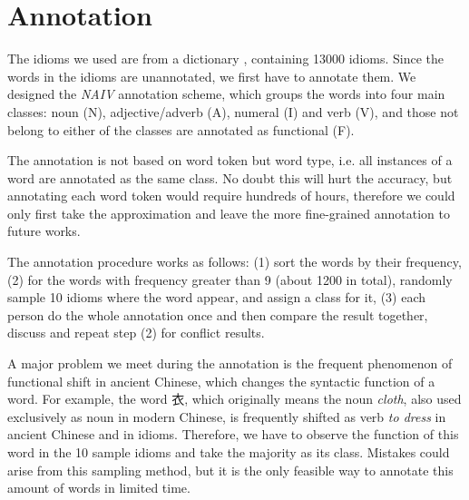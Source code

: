 
\section{Annotation}\label{anno}
The idioms we used are from a dictionary \citep{song:2014}, containing 13000 idioms. 
Since the words in the idioms are unannotated, we first have to annotate them. We designed the {\em NAIV} annotation scheme, which  groups the words into four main classes: noun (N), adjective/adverb (A), numeral (I) and verb (V), and those not belong to either of the classes are annotated as functional (F). 

The annotation is not based on word token but word type, i.e. all instances of a word are annotated as the same class. No doubt this will hurt the accuracy, but annotating each word token would require hundreds of hours, therefore we could only first take the approximation and leave the more fine-grained annotation to future works.

The annotation procedure works as follows: (1) sort the words by their frequency, (2) for the words with frequency greater than 9 (about 1200 in total), randomly sample 10 idioms where the word appear, and assign a class for it, (3) each person do the whole annotation once and then compare the result together, discuss and repeat step (2) for conflict results.


A major problem we meet during the annotation is the frequent phenomenon of functional shift in ancient Chinese, which changes the syntactic function of a word. For example, the word 衣, which originally means the noun {\em cloth}, also used exclusively as noun in modern Chinese, is frequently shifted as verb {\em to dress} in ancient Chinese and in idioms. Therefore, we have to observe the function of this word in the 10 sample idioms and take the majority as its class. Mistakes could arise from this sampling method, but it is the only feasible way to annotate this amount of words in limited time.
